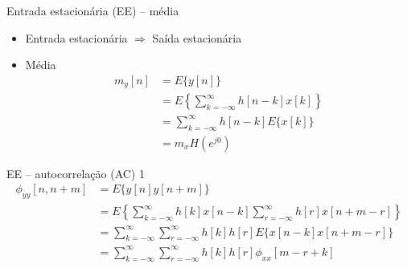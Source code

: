 \documentclass[
size=17pt,
paper=smartboard,
mode=present,
display=slidesnotes,
style=sailor,
nopagebreaks,
blackslide,
fleqn]{powerdot}
\begin{document}
\begin{slide}[toc=]{Entrada estacionária (EE) -- média}
\begin{itemize}
   \item Entrada estacion\'aria $\Rightarrow$ Sa\'ida estacion\'aria
   \item M\'edia
   \begin{align*}
      m_y[n] &= E\{y[n]\}\\
             &= E\left \{\sum_{k=-\infty}^{\infty} h[n-k] x[k]\right \}\\
             &= \sum_{k=-\infty}^{\infty} h[n-k] E\{x[k]\}\\
             &= m_x H\left (e^{j0}\right )
   \end{align*}
\end{itemize}
\end{slide}

\begin{slide}[toc=]{EE -- autocorrelação (AC) 1}
   \scriptsize{
   \begin{align*}
      \phi_{yy}[n,n+m] &= E\{y[n]y[n+m]\}\\
             &= E\left\{\sum_{k=-\infty}^{\infty} h[k] x[n-k]\sum_{r=-\infty}^{\infty} h[r] x[n+m-r]\right\}\\
             &= \sum_{k=-\infty}^{\infty} \sum_{r=-\infty}^{\infty} h[k]h[r] E\{x[n-k]x[n+m-r]\}\\
             &= \sum_{k=-\infty}^{\infty} \sum_{r=-\infty}^{\infty} h[k]h[r] \phi_{xx}[m-r+k]
   \end{align*}}
\end{slide}
\end{document}
